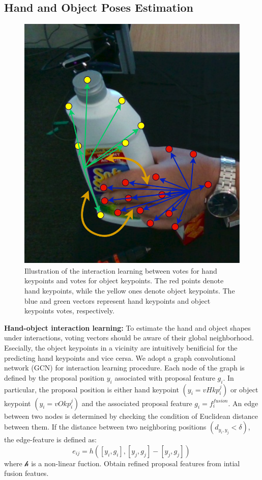 \subsection{Hand and Object Poses Estimation}
\label{sec:interaction}
\begin{figure}[h!]
	\centering
	\includegraphics[width=0.6\linewidth]{Figs/Hand-object.png}
	\caption{Illustration of the interaction learning between votes for hand keypoints and votes for object keypoints. The red points denote hand keypoints, while the yellow ones denote object keypoints. The blue and green vectors represent hand keypoints and object keypoints votes, respectively.}
\end{figure}
\textbf{Hand-object interaction learning:} To estimate the hand and object shapes under interactions, voting vectors should be aware of their global neighborhood. Esecially, the object keypoints in a vicinity are intuitively benificial for the predicting hand keypoints and vice cersa. We adopt a graph convolutional network (GCN) for interaction learning procedure. Each node of the graph is defined by the proposal position $y_i$ associated with proposal feature $g_i$. In particular, the proposal position is either hand keypoint $(y_i = vHkp^j_i)$ or object keypoint $(y_i = vOkp^j_i)$ and the associated proposal feature $g_i=f^{fusion}_i$. An edge between two nodes is determined by checking the condition of Euclidean distance between them. If the distance between two neighboring positions $(d_{y_i, y_j} < \delta)$, the edge-feature is defined as:
\begin{equation}
	e_{ij} = \mathit{h}([y_i,g_i],[y_j, g_j]-[y_j,g_j]) \
	\label{eq:edge_feature}
\end{equation}
where $\mathcal{h}$ is a non-linear fuction. Obtain refined proposal features from intial fusion featues. 

